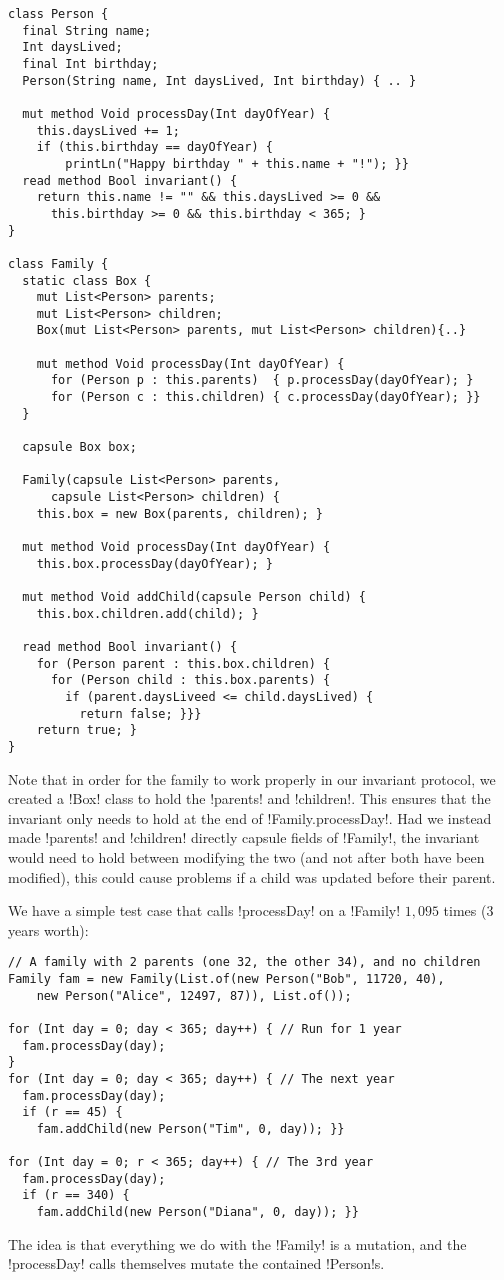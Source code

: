 \begin{lstlisting}
class Person { 
  final String name;
  Int daysLived;
  final Int birthday;
  Person(String name, Int daysLived, Int birthday) { .. }
  
  mut method Void processDay(Int dayOfYear) {
  	this.daysLived += 1;
    if (this.birthday == dayOfYear) {
    	printLn("Happy birthday " + this.name + "!"); }}
  read method Bool invariant() {
    return this.name != "" && this.daysLived >= 0 &&
      this.birthday >= 0 && this.birthday < 365; }
}

class Family { 
  static class Box { 
    mut List<Person> parents;
    mut List<Person> children;
    Box(mut List<Person> parents, mut List<Person> children){..}
      
    mut method Void processDay(Int dayOfYear) {
      for (Person p : this.parents)  { p.processDay(dayOfYear); }
      for (Person c : this.children) { c.processDay(dayOfYear); }}
  }

  capsule Box box;

  Family(capsule List<Person> parents, 
      capsule List<Person> children) { 
    this.box = new Box(parents, children); }

  mut method Void processDay(Int dayOfYear) { 
    this.box.processDay(dayOfYear); }

  mut method Void addChild(capsule Person child) { 
    this.box.children.add(child); }

  read method Bool invariant() {
    for (Person parent : this.box.children) {
      for (Person child : this.box.parents) {
        if (parent.daysLiveed <= child.daysLived) { 
          return false; }}}
    return true; }
}
\end{lstlisting}
Note that in order for the family to work properly in our invariant protocol, we created a \Q!Box! class to hold the \Q!parents! and \Q!children!. This ensures that the invariant only needs to hold at the end of \Q!Family.processDay!. Had we instead made \Q!parents! and \Q!children! directly capsule fields of \Q!Family!, the invariant would need to hold between modifying the two (and not after both have been modified), this could cause problems if a child was updated before their parent.

We have a simple test case that calls \Q!processDay! on a \Q!Family! $1,095$ times (3 years worth):
\begin{lstlisting}
// A family with 2 parents (one 32, the other 34), and no children
Family fam = new Family(List.of(new Person("Bob", 11720, 40), 
    new Person("Alice", 12497, 87)), List.of());
    
for (Int day = 0; day < 365; day++) { // Run for 1 year
  fam.processDay(day);
}
for (Int day = 0; day < 365; day++) { // The next year
  fam.processDay(day);
  if (r == 45) {
    fam.addChild(new Person("Tim", 0, day)); }}

for (Int day = 0; r < 365; day++) { // The 3rd year
  fam.processDay(day);
  if (r == 340) {
    fam.addChild(new Person("Diana", 0, day)); }}
\end{lstlisting}
The idea is that everything we do with the \Q!Family! is a mutation, and the \Q!processDay! calls themselves mutate the contained \Q!Person!s.


